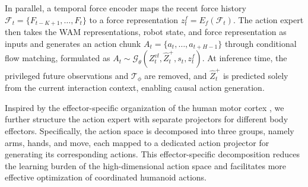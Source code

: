 \documentclass{article} %
\begin{document}
In parallel, a temporal force encoder maps the recent force history
$\mathcal{F}_t=\{F_{t-K+1},\ldots,F_t\}$ to a force representation
$z_t^f=E_f(\mathcal{F}_t)$. The action expert then takes the WAM
representations, robot state, and force representation as inputs and
generates an action chunk $A_t=\{a_t,\ldots,a_{t+H-1}\}$ through conditional
flow matching, formulated as
$A_t \sim \mathcal{G}_{\theta}(Z_t^{vl},\hat{Z}_t^{+},s_t,z_t^f)$.
At inference time, the privileged future observations and
$\mathcal{T}_{\phi}$ are removed, and $\hat{Z}_t^{+}$ is predicted solely
from the current interaction context, enabling causal action generation.

Inspired by the effector-specific organization of the human motor cortex \cite{gordon2023somato}, we further structure the action expert with separate projectors for different body effectors. Specifically, the action space is decomposed into three groups, namely arms, hands, and move, each mapped to a dedicated action projector for generating its corresponding actions. This effector-specific decomposition reduces the learning burden of the high-dimensional action space and facilitates more effective optimization of coordinated humanoid actions.




\end{document}
